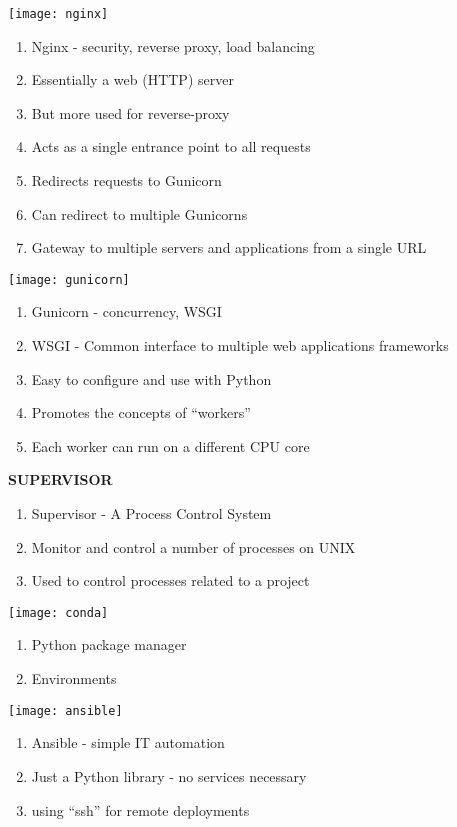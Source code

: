 \documentclass[portrait,a0paper,fontscale=0.35]{baposter} %
\newcommand{\compresslist}{%
\setlength{\itemsep}{1pt}%
\setlength{\parskip}{0pt}%
\setlength{\parsep}{0pt}%
}
\begin{document}
\begin{poster}
{\begin{multicols}{2}
    \texttt{[image: nginx]}
    \begin{enumerate}\compresslist
      \item Nginx - security, reverse proxy, load balancing
      \item Essentially a web (HTTP) server
      \item But more used for reverse-proxy
      \item Acts as a single entrance point to all requests
      \item Redirects requests to Gunicorn
      \item Can redirect to multiple Gunicorns
      \item Gateway to multiple servers and applications from a single URL
    \end{enumerate}

    \texttt{[image: gunicorn]}
    \begin{enumerate}\compresslist
      \item Gunicorn - concurrency, WSGI
      \item WSGI - Common interface to multiple web applications frameworks
      \item Easy to configure and use with Python
      \item Promotes the concepts of ``workers''
      \item Each worker can run on a different CPU core
    \end{enumerate}

    {\bf SUPERVISOR}
    \begin{enumerate}\compresslist
      \item Supervisor - A Process Control System
      \item Monitor and control a number of processes on UNIX
      \item Used to control processes related to a project
    \end{enumerate}

    \texttt{[image: conda]}
    \begin{enumerate}\compresslist
      \item Python package manager
      \item Environments
    \end{enumerate}

    \texttt{[image: ansible]}
    \begin{enumerate}\compresslist
      \item Ansible - simple IT automation
      \item Just a Python library - no services necessary
      \item using ``ssh'' for remote deployments
    \end{enumerate}


\end{multicols}}
\end{poster}
\end{document}
